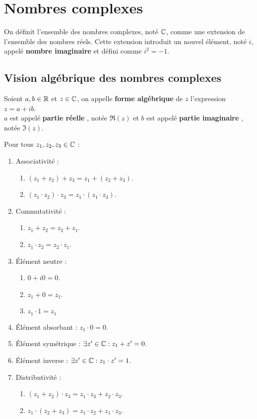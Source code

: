 \chapter{Nombres complexes}
\def\arraystretch{1}
On définit l'ensemble des nombres complexes, noté $\mathbb{C}$, comme une extension de l'ensemble des nombres réels.
Cette extension introduit un nouvel élément, noté $i$, appelé \textbf{nombre imaginaire} et défini comme $i^2=-1$.

\section{Vision algébrique des nombres complexes}
\begin{definition}
    Soient $a, b \in \mathbb{R}$ et $z \in \mathbb{C}$, on appelle \textbf{forme algébrique} de $z$ l'expression $z = a + ib$.
    \\
    $a$ est appelé \og \textbf{partie réelle} \fg, notée $\Re(z)$ et $b$ est appelé \og \textbf{partie imaginaire} \fg, notée $\Im(z)$.
\end{definition}

\begin{proposition}
	Pour tous $z_1, z_2, z_3 \in \mathbb{C}$ :
	\begin{enumerate}
		\item Associativité : 
		\begin{enumerate}
			\item $(z_1 + z_2) + z_3 = z_1 + (z_2 + z_3)$.
			\item $(z_1 \cdot z_2) \cdot z_3 = z_1 \cdot (z_1 \cdot z_3)$.
		\end{enumerate}
		\item Commutativité :
		\begin{enumerate}
			\item $z_1 + z_2 = z_2 + z_1$.
			\item $z_1 \cdot z_2 = z_2 \cdot z_1$.
		\end{enumerate}
		\item \'Elément neutre :
		\begin{enumerate}
			\item $0 + i0 = 0$.
			\item $z_1 + 0 = z_1$.
			\item $z_1 \cdot 1 = z_1$
		\end{enumerate}
		\item \'Elément absorbant : $z_1 \cdot 0 = 0$.
		\item \'Elément symétrique : $\exists z' \in \mathbb{C} : z_1 + z' = 0$.
		\item \'Elément inverse : $\exists z' \in \mathbb{C} :  z_1 \cdot z' = 1$.
		\item Distributivité :
		\begin{enumerate}
			\item $(z_1 + z_2) \cdot z_3 = z_1 \cdot z_3 + z_2 \cdot z_3$.
			\item $z_1 \cdot (z_2 + z_3) = z_1 \cdot z_2 + z_1 \cdot z_3$.
		\end{enumerate}
	\end{enumerate}
\end{proposition}

